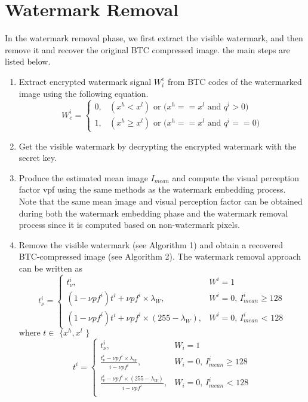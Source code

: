 \documentclass[12pt,a4paper]{article}
\begin{document}
\tableofcontents
 
\section{Watermark Removal}

In the watermark removal phase, we first extract the visible watermark, and then remove it and recover the original BTC compressed image. the main steps are listed below.

\begin{enumerate}[label=\arabic*.]
\item Extract encrypted watermark signal $W^e_i$ from BTC codes of the watermarked image using the following equation.
\begin{equation}
\label{eq1}
    W^i_e = 
    \begin{cases}
    0, &\text{$(x^h<x^l)$ or $(x^h == x^l$ and $q^i > 0)$}\\
    1, &\text{$(x^h \ge x^l)$ or $(x^h==x^l$ and $q^i == 0)$}
    \end{cases}
\end{equation}
\item Get the visible watermark by decrypting the encrypted watermark with the secret key.
\item Produce the estimated mean image $I_{mean}$ and compute the visual perception factor vpf using the same methods as the watermark embedding process. Note that the same mean image and visual perception factor can be obtained during both the watermark embedding phase and the watermark removal process since it is computed based on non-watermark pixels.
\item Remove the visible watermark (see Algorithm 1) and obtain a recovered BTC-compressed image (see Algorithm 2). The watermark removal approach can be written as
\begin{equation}
\label{eq3}
    t^i_\nu = 
    \begin{cases}
    t^i_\nu, &\text{$W^i=1$}\\
    {(1-\nu p f^i)t^i+\nu p f^i\times \lambda_W}, &\text{$W^i=0$, $I^i_{mean} \ge 128$}\\
     {(1-\nu p f^i)t^i+\nu p f^i\times(255 -\lambda_W)}, &\text{$W^i=0$, $I^i_{mean}$ < 128}
    \end{cases}
\end{equation}
\newline $\text{where $t \in $ \{ $x^h,x^l$ \}}$
\begin{equation}
\label{eq2}
    t^i = 
    \begin{cases}
    t^i_\nu, &\text{$W_i=1$}\\
    \frac{t^i_\nu-\nu p f^i \times \lambda_W}{i - \nu p f^i}, &\text{$W_i=0$, $I^i_{mean} \ge 128$}\\
    \frac{t^i_\nu-\nu p f^i \times (255-\lambda_W)}{i - \nu p f^i}, &\text{$W_i=0$, $I^i_{mean}$ < 128}\\
    \end{cases}
\end{equation}

\end{enumerate}
\end{document}
